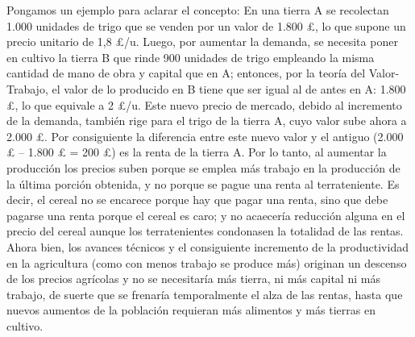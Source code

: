 \documentclass[10pt,a4paper]{article}
\begin{document}
Pongamos un ejemplo para aclarar el concepto: En una tierra A se recolectan 1.000 unidades de trigo que se venden por un valor de 1.800 £, lo que supone un precio unitario de 1,8 £/u. Luego, por aumentar la demanda, se necesita poner en cultivo la tierra B que rinde 900 unidades de trigo empleando la misma cantidad de mano de obra y capital que en A; entonces, por la teoría del Valor-Trabajo, el valor de lo producido en B tiene que ser igual al de antes en A: 1.800 £, lo que equivale a 2 £/u. Este nuevo precio de mercado, debido al incremento de la demanda, también rige para el trigo de la tierra A, cuyo valor sube ahora a 2.000 £. Por consiguiente la diferencia entre este nuevo valor y el antiguo (2.000 £ – 1.800 £ = 200 £) es la renta de la tierra A. Por lo tanto, al aumentar la producción los precios suben porque se emplea más trabajo en la producción de la última porción obtenida, y no porque se pague una renta al terrateniente. Es decir, el cereal no se encarece porque hay que pagar una renta, sino que debe pagarse una renta porque el cereal es caro; y no acaecería reducción alguna en el precio del cereal aunque los terratenientes condonasen la totalidad de las rentas. Ahora bien, los avances técnicos y el consiguiente incremento de la productividad en la agricultura (como con menos trabajo se produce más) originan un descenso de los precios agrícolas y no se necesitaría más tierra, ni más capital ni más trabajo, de suerte que se frenaría temporalmente el alza de las rentas, hasta que nuevos aumentos de la población requieran más alimentos y más tierras en cultivo.
\end{document}
